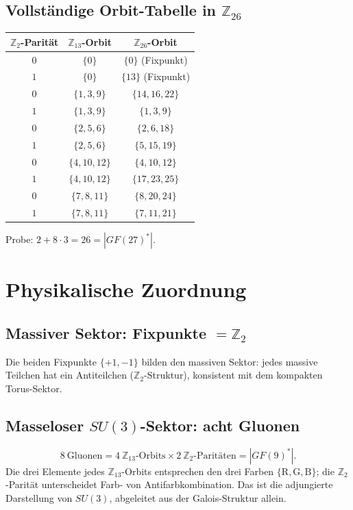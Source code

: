 \subsection{Vollständige Orbit-Tabelle in $\mathbb{Z}_{26}$ \BM}

\begin{center}
\begin{tabular}{ccc}
\toprule
$\mathbb{Z}_2$-Parität & $\mathbb{Z}_{13}$-Orbit & $\mathbb{Z}_{26}$-Orbit \\
\midrule
$0$ & $\{0\}$       & $\{0\}$ (Fixpunkt) \\
$1$ & $\{0\}$       & $\{13\}$ (Fixpunkt) \\
$0$ & $\{1,3,9\}$   & $\{14,16,22\}$ \\
$1$ & $\{1,3,9\}$   & $\{1,3,9\}$ \\
$0$ & $\{2,5,6\}$   & $\{2,6,18\}$ \\
$1$ & $\{2,5,6\}$   & $\{5,15,19\}$ \\
$0$ & $\{4,10,12\}$ & $\{4,10,12\}$ \\
$1$ & $\{4,10,12\}$ & $\{17,23,25\}$ \\
$0$ & $\{7,8,11\}$  & $\{8,20,24\}$ \\
$1$ & $\{7,8,11\}$  & $\{7,11,21\}$ \\
\bottomrule
\end{tabular}
\end{center}

Probe: $2+8\cdot3=26=|GF(27)^*|$.~\checkmark

\section{Physikalische Zuordnung \KM}

\subsection{Massiver Sektor: Fixpunkte $=\mathbb{Z}_2$}

Die beiden Fixpunkte $\{+1,-1\}$ bilden den massiven Sektor: jedes massive
Teilchen hat ein Antiteilchen ($\mathbb{Z}_2$-Struktur), konsistent mit dem
kompakten Torus-Sektor.

\subsection{Masseloser $SU(3)$-Sektor: acht Gluonen}

\[
8\ \text{Gluonen}
= 4\ \mathbb{Z}_{13}\text{-Orbits} \times 2\ \mathbb{Z}_2\text{-Paritäten}
= |GF(9)^*|.
\]
Die drei Elemente jedes $\mathbb{Z}_{13}$-Orbits entsprechen den drei Farben
$\{\mathrm{R},\mathrm{G},\mathrm{B}\}$; die $\mathbb{Z}_2$-Parität unterscheidet
Farb- von Antifarbkombination. Das ist die adjungierte Darstellung von $SU(3)$,
abgeleitet aus der Galois-Struktur allein.

